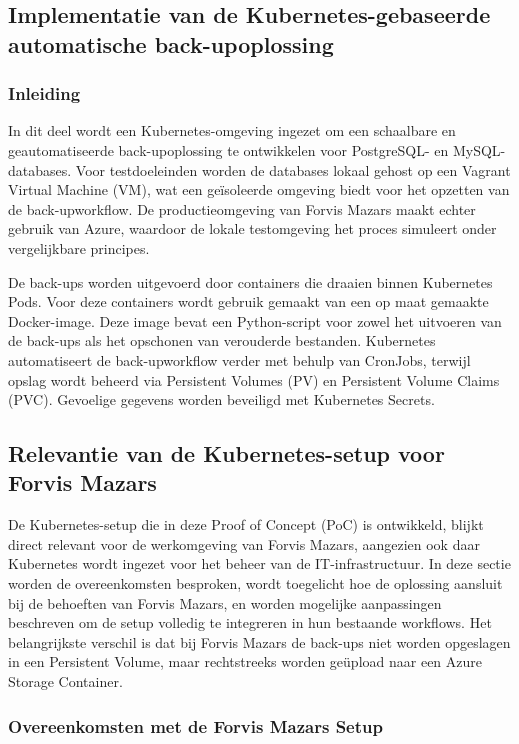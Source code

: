 \subsection{Implementatie van de Kubernetes-gebaseerde automatische back-upoplossing}

\subsubsection{Inleiding}
In dit deel wordt een Kubernetes-omgeving ingezet om een schaalbare en geautomatiseerde back-upoplossing te ontwikkelen voor PostgreSQL- en MySQL-databases. Voor testdoeleinden worden de databases lokaal gehost op een Vagrant Virtual Machine (VM), wat een geïsoleerde omgeving biedt voor het opzetten van de back-upworkflow. De productieomgeving van Forvis Mazars maakt echter gebruik van Azure, waardoor de lokale testomgeving het proces simuleert onder vergelijkbare principes.

De back-ups worden uitgevoerd door containers die draaien binnen Kubernetes Pods. Voor deze containers wordt gebruik gemaakt van een op maat gemaakte Docker-image. Deze image bevat een Python-script voor zowel het uitvoeren van de back-ups als het opschonen van verouderde bestanden. Kubernetes automatiseert de back-upworkflow verder met behulp van CronJobs, terwijl opslag wordt beheerd via Persistent Volumes (PV) en Persistent Volume Claims (PVC). Gevoelige gegevens worden beveiligd met Kubernetes Secrets.

\subsection{Relevantie van de Kubernetes-setup voor Forvis Mazars}

De Kubernetes-setup die in deze Proof of Concept (PoC) is ontwikkeld, blijkt direct relevant voor de werkomgeving van Forvis Mazars, aangezien ook daar Kubernetes wordt ingezet voor het beheer van de IT-infrastructuur. In deze sectie worden de overeenkomsten besproken, wordt toegelicht hoe de oplossing aansluit bij de behoeften van Forvis Mazars, en worden mogelijke aanpassingen beschreven om de setup volledig te integreren in hun bestaande workflows. Het belangrijkste verschil is dat bij Forvis Mazars de back-ups niet worden opgeslagen in een Persistent Volume, maar rechtstreeks worden geüpload naar een Azure Storage Container.

\subsubsection*{Overeenkomsten met de Forvis Mazars Setup}

